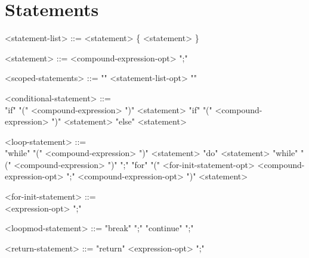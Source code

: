 \documentclass[11pt,letterpaper]{book}
\begin{document}
\section*{Statements}
\begin{grammar}

<statement-list> ::= <statement> \{ <statement> \}

<statement> ::= 
<compound-expression-opt> ";"

<scoped-statements> ::= "{" <statement-list-opt> "}"

<conditional-statement> ::= \spc \\ "if" "(" <compound-expression> ")" <statement>
\alt "if" "(" <compound-expression> ")" <statement> "else" <statement>

<loop-statement> ::= \spc \\ "while" "(" <compound-expression> ")" <statement>
\alt "do" <statement> "while" "(" <compound-expression> ")" ";"
\alt "for" "(" <for-init-statement-opt>  <compound-expression-opt> ";" 
                <compound-expression-opt> ")" <statement>

<for-init-statement> ::= \spc \\ <expression-opt> ";"

<loopmod-statement> ::= "break" ";"
\alt "continue" ";"


<return-statement> ::= "return" <expression-opt> ";"

\end{grammar}
\end{document}
